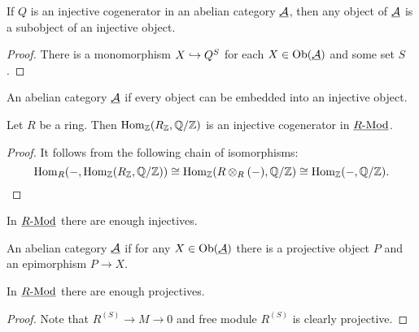 \begin{proposition*}
	If \( Q \) is an injective cogenerator in an abelian category \( \underline{\mathcal{A}} \), then any object of \( \underline{\mathcal{A}} \) is a subobject of an injective object.
\end{proposition*}
\begin{proof}
	There is a monomorphism \( X \hookrightarrow Q^S \) for each \( X \in \operatorname{Ob}(\underline{\mathcal{A}}) \) and some set \( S \).
\end{proof}

\begin{definition*}
	An abelian category \( \underline{\mathcal{A}} \)  if every object can be embedded into an injective object.
\end{definition*}

\begin{proposition*}
	Let \( R \) be a ring. Then \( \operatorname{Hom}_\mathbb{Z}(R_\mathbb{Z}, \mathbb{Q}/\mathbb{Z}) \) is an injective cogenerator in \( \underline{R\text{-}\mathrm{Mod}} \).
\end{proposition*}
\begin{proof}
	It follows from the following chain of isomorphisms:
	\[\operatorname{Hom}_R(-, \operatorname{Hom}_\mathbb{Z}(R_\mathbb{Z}, \mathbb{Q}/\mathbb{Z})) \cong \operatorname{Hom}_\mathbb{Z}(R \otimes_R (-), \mathbb{Q}/\mathbb{Z}) \cong \operatorname{Hom}_\mathbb{Z}(-, \mathbb{Q}/\mathbb{Z}).\]
\end{proof}

\begin{corollary*}
	In \( \underline{R\text{-}\mathrm{Mod}} \) there are enough injectives.
\end{corollary*}

\begin{definition*}
	An abelian category \( \underline{\mathcal{A}} \)  if for any \( X \in \operatorname{Ob}(\underline{\mathcal{A}}) \) there is a projective object \( P \) and an epimorphism \( P \to X \).
\end{definition*}

\begin{proposition*}
	In \( \underline{R\text{-}\mathrm{Mod}} \) there are enough projectives.
\end{proposition*}
\begin{proof}
	Note that \( R^{(S)} \to M \to 0 \) and free module \( R^{(S)} \) is clearly projective.
\end{proof}

